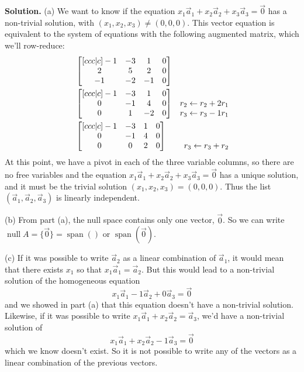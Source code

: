 \documentclass[11pt, letterpaper]{report}
\newenvironment{book}{}{}
\DeclareMathOperator{\nul}{null}
\DeclareMathOperator{\spn}{span}
\begin{document}
\begin{book}
\textbf{Solution.} (a) We want to know if the equation $x_1\vec{a}_1+x_2\vec{a}_2+x_3\vec{a}_3=\vec{0}$ has a non-trivial solution, with $(x_1,x_2,x_3) \ne (0,0,0)$. This vector equation is equivalent to the system of equations with the following augmented matrix, which we'll row-reduce:
\begin{align*}
&\begin{bmatrix}[ccc|c]
-1 & -3 & 1 & 0 \\
2 & 5 & 2 & 0 \\
-1 & -2 & -1 & 0
\end{bmatrix} \\
&\begin{bmatrix}[ccc|c]
-1 & -3 & 1 & 0 \\
0 & -1 & 4 & 0 \\
0 & 1 & -2 & 0
\end{bmatrix} &\begin{matrix}
\rule{1em}{0pt} \\ r_2 \leftarrow r_2+2r_1 \\ r_3 \leftarrow r_3-1r_1
\end{matrix} \\
&\begin{bmatrix}[ccc|c]
-1 & -3 & 1 & 0 \\
0 & -1 & 4 & 0\\
0 & 0 & 2 & 0
\end{bmatrix} &\begin{matrix}
\rule{1em}{0pt} \\ \rule{1em}{0pt} \\ r_3 \leftarrow r_3+r_2
\end{matrix}
\end{align*}
At this point, we have a pivot in each of the three variable columns, so there are no free variables and the equation $x_1\vec{a}_1+x_2\vec{a}_2+x_3\vec{a}_3=\vec{0}$ has a unique solution, and it must be the trivial solution $(x_1,x_2,x_3)=(0,0,0)$. Thus the list $(\vec{a}_1,\vec{a}_2,\vec{a}_3)$ is linearly independent.

(b) From part (a), the null space contains only one vector, $\vec{0}$. So we can write $\nul A = \{ \vec{0} \} = \spn ()$ or $\spn(\vec{0})$.

(c) If it was possible to write $\vec{a}_2$ as a linear combination of $\vec{a}_1$, it would mean that there exists $x_1$ so that $x_1\vec{a}_1=\vec{a}_2$. But this would lead to a non-trivial solution of the homogeneous equation
\[x_1\vec{a}_1-1\vec{a}_2+0\vec{a}_3=\vec{0}\]
and we showed in part (a) that this equation doesn't have a non-trivial solution. Likewise, if it was possible to write $x_1\vec{a}_1+x_2\vec{a}_2=\vec{a}_3$, we'd have a non-trivial solution of
\[x_1\vec{a}_1+x_2\vec{a}_2-1\vec{a}_3=\vec{0}\]
which we know doesn't exist. So it is not possible to write any of the vectors as a linear combination of the previous vectors.

 \blacksquare
\end{book}
\end{document}
